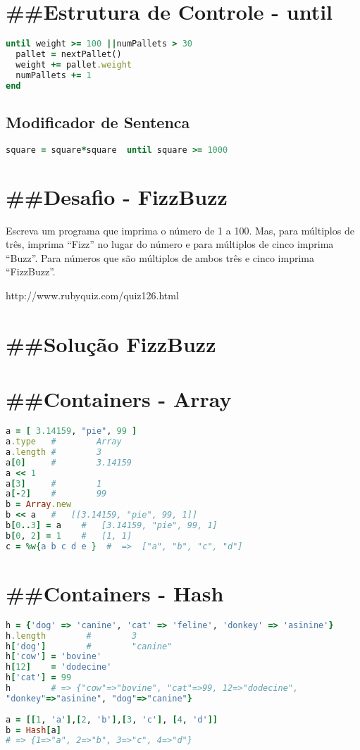 \documentclass[serif,mathserif]{article}
\begin{document}
\section{\#\#Estrutura de Controle -  until} 
\begin{lstlisting}[language=ruby]
until weight >= 100 ||numPallets > 30
  pallet = nextPallet()
  weight += pallet.weight
  numPallets += 1
end
\end{lstlisting}

\subsection {Modificador de Sentenca}
\begin{lstlisting}[language=ruby]
square = square*square  until square >= 1000
\end{lstlisting}

\section{\#\#Desafio - FizzBuzz}  
Escreva um programa que imprima o número de 1 a 100.
Mas, para múltiplos de três, imprima  ``Fizz'' no lugar do
número e para múltiplos de cinco imprima ``Buzz''. Para
números que são múltiplos de ambos três e cinco
imprima ``FizzBuzz''.

http://www.rubyquiz.com/quiz126.html

\section{\#\#Solução FizzBuzz}



\section{\#\#Containers - Array}
\begin{lstlisting}[language=ruby]
a = [ 3.14159, "pie", 99 ]
a.type   #        Array
a.length #        3
a[0]     #        3.14159
a << 1
a[3]     #        1
a[-2]    #        99
b = Array.new
b << a   #   [[3.14159, "pie", 99, 1]]
b[0..3] = a    #   [3.14159, "pie", 99, 1]
b[0, 2] = 1    #   [1, 1]
c = %w{a b c d e }  #  =>  ["a", "b", "c", "d"]
\end{lstlisting}


\section{\#\#Containers - Hash}
\begin{lstlisting}[language=ruby]
h = {'dog' => 'canine', 'cat' => 'feline', 'donkey' => 'asinine'}
h.length        #        3
h['dog']        #        "canine"
h['cow'] = 'bovine'
h[12]    = 'dodecine'
h['cat'] = 99
h        # => {"cow"=>"bovine", "cat"=>99, 12=>"dodecine",
"donkey"=>"asinine", "dog"=>"canine"}
  
a = [[1, 'a'],[2, 'b'],[3, 'c'], [4, 'd']]
b = Hash[a]
# => {1=>"a", 2=>"b", 3=>"c", 4=>"d"}
\end{lstlisting}
\end{document}
